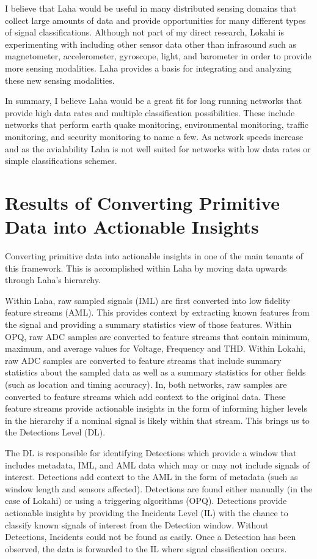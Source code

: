I believe that Laha would be useful in many distributed sensing domains that collect large amounts of data and provide opportunities for many different types of signal classifications. Although not part of my direct research, Lokahi is experimenting with including other sensor data other than infrasound such as magnetometer, accelerometer, gyroscope, light, and barometer in order to provide more sensing modalities. Laha provides a basis for integrating and analyzing these new sensing modalities.

In summary, I believe Laha would be a great fit for long running networks that provide high data rates and multiple classification possibilities. These include networks that perform earth quake monitoring, environmental monitoring, traffic monitoring, and security monitoring to name a few. As network speeds increase and as the avialability  Laha is not well suited for networks with low data rates or simple classifications schemes.

\section{Results of Converting Primitive Data into Actionable Insights}\label{sec:results-of-converting-primitie-data-into-actional-insights}

Converting primitive data into actionable insights in one of the main tenants of this framework. This is accomplished within Laha by moving data upwards through Laha's hierarchy.

Within Laha, raw sampled signals (IML) are first converted into low fidelity feature streams (AML). This provides context by extracting known features from the signal and providing a summary statistics view of those features. Within OPQ, raw ADC samples are converted to feature streams that contain minimum, maximum, and average values for Voltage, Frequency and THD. Within Lokahi, raw ADC samples are converted to feature streams that include summary statistics about the sampled data as well as a summary statistics for other fields (such as location and timing accuracy). In, both networks, raw samples are converted to feature streams which add context to the original data. These feature streams provide actionable insights in the form of informing higher levels in the hierarchy if a nominal signal is likely within that stream. This brings us to the Detections Level (DL).

The DL is responsible for identifying Detections which provide a window that includes metadata, IML, and AML data which may or may not include signals of interest. Detections add context to the AML in the form of metadata (such as window length and sensors affected). Detections are found either manually (in the case of Lokahi) or using a triggering algorithms (OPQ). Detections provide actionable insights by providing the Incidents Level (IL) with the chance to classify known signals of interest from the Detection window. Without Detections, Incidents could not be found as easily. Once a Detection has been observed, the data is forwarded to the IL where signal classification occurs.

